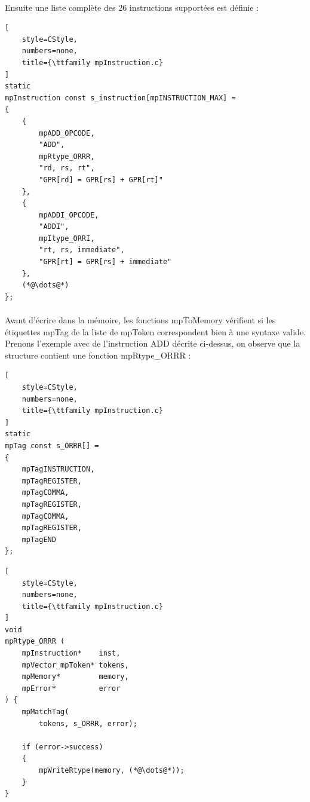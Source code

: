 \documentclass[12pt]{report} %
\begin{document}
\paragraph{}
Ensuite une liste complète des 26 instructions supportées est définie :


\begin{lstlisting}[
    style=CStyle,
    numbers=none,
    title={\ttfamily mpInstruction.c}
]
static
mpInstruction const s_instruction[mpINSTRUCTION_MAX] =
{
    {
        mpADD_OPCODE,
        "ADD",
        mpRtype_ORRR,
        "rd, rs, rt",
        "GPR[rd] = GPR[rs] + GPR[rt]"
    },
    {
        mpADDI_OPCODE,
        "ADDI",
        mpItype_ORRI,
        "rt, rs, immediate",
        "GPR[rt] = GPR[rs] + immediate"
    },
    (*@\dots@*)
};
\end{lstlisting}

\paragraph{}
Avant d'écrire dans la mémoire, les fonctions  {\ttfamily mpToMemory} vérifient si les étiquettes {\ttfamily mpTag} de la liste de {\ttfamily mpToken} correspondent bien à une syntaxe valide. Prenons l'exemple avec de l'instruction {\ttfamily ADD} décrite ci-dessus, on observe que la structure contient une fonction {\ttfamily mpRtype\_ORRR} :

\noindent
\begin{minipage}[t]{.45\textwidth}
\begin{lstlisting}[
    style=CStyle,
    numbers=none,
    title={\ttfamily mpInstruction.c}
]
static
mpTag const s_ORRR[] =
{
    mpTagINSTRUCTION,
    mpTagREGISTER,
    mpTagCOMMA,
    mpTagREGISTER,
    mpTagCOMMA,
    mpTagREGISTER,
    mpTagEND
};
\end{lstlisting}
\end{minipage}\hfill
%
\begin{minipage}[t]{.45\textwidth}
\begin{lstlisting}[
    style=CStyle,
    numbers=none,
    title={\ttfamily mpInstruction.c}
]
void
mpRtype_ORRR (
    mpInstruction*    inst,
    mpVector_mpToken* tokens,
    mpMemory*         memory,
    mpError*          error
) {
    mpMatchTag(
        tokens, s_ORRR, error);

    if (error->success)
    {
        mpWriteRtype(memory, (*@\dots@*));
    }
}
\end{lstlisting}
\end{minipage}
\end{document}
